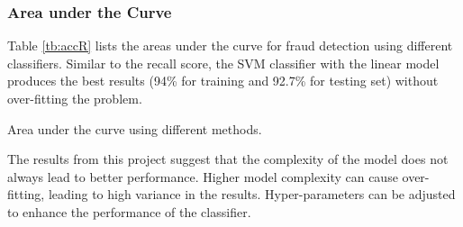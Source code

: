 \subsubsection{\textbf{Area under the Curve}}
Table \ref{tb:accR} lists the areas under the curve for fraud detection using different classifiers. Similar to the recall score, the SVM classifier with the linear model produces the best results (94\% for training and 92.7\% for testing set) without over-fitting the problem.

\begin{table}[!ht]
\centering
{}
\caption{Area under the curve using different methods.}\label{tb:aucR}
\end{table}

The results from this project suggest that the complexity of the model does not always lead to better performance. Higher model complexity can cause over-fitting, leading to high variance in the results. Hyper-parameters can be adjusted to enhance the performance of the classifier.

